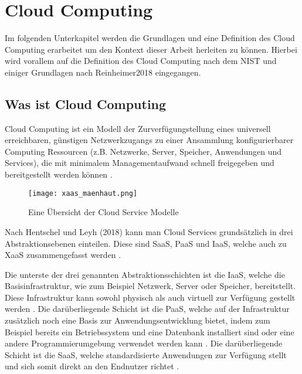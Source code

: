 \section{Cloud Computing}

Im folgenden Unterkapitel werden die Grundlagen und eine Definition des Cloud Computing erarbeitet um den Kontext dieser Arbeit herleiten zu können.
Hierbei wird vorallem auf die Definition des Cloud Computing nach dem NIST und einiger Grundlagen nach Reinheimer2018 eingegangen.

\subsection{Was ist Cloud Computing}

Cloud Computing ist ein Modell der Zurverfügungstellung eines universell erreichbaren,
günstigen Netzwerkzugangs zu einer Ansammlung konfigurierbarer Computing Ressourcen
(z.B. Netzwerke, Server, Speicher, Anwendungen und Services), die mit minimalem Managementaufwand schnell freigegeben und bereitgestellt werden können
\cite[Vgl.][S. 2]{Mell2011}.

\begin{wrapfigure}{r}{0.45\textwidth}
\centering
\texttt{[image: xaas\_maenhaut.png]}
\caption{Eine Übersicht der Cloud Service Modelle \cite{Maenhaut2016}}
\end{wrapfigure}

Nach Hentschel und Leyh (2018) kann man Cloud Services grundsätzlich in drei Abstraktionsebenen einteilen. Diese sind \acf{SaaS},
\acf{PaaS} und \acf{IaaS}, welche auch zu \acf{XaaS} zusammengefasst werden
\cite[Vgl.][S. 9]{Reinheimer2018}.

Die unterste der drei genannten Abstraktionsschichten ist die \acf{IaaS}, welche die Basisinfrastruktur, wie zum Beispiel Netzwerk, Server oder Speicher,
bereitstellt. Diese Infrastruktur kann sowohl physisch als auch virtuell zur Verfügung gestellt werden \cite[Vgl.][S. 9f]{Reinheimer2018}.
Die darüberliegende Schicht ist die \acf{PaaS}, welche auf der Infrastruktur zusätzlich noch eine Basis zur Anwendungsentwicklung bietet, indem zum Beispiel
bereits ein Betriebssystem und eine Datenbank installiert sind oder eine andere Programmierumgebung verwendet werden kann \cite[Vgl.][S. 10]{Reinheimer2018}.
Die darüberliegende Schicht ist die \acf{SaaS}, welche standardisierte Anwendungen zur Verfügung stellt und sich somit direkt an den Endnutzer richtet
\cite[Vgl.][S. 11]{Reinheimer2018}.

